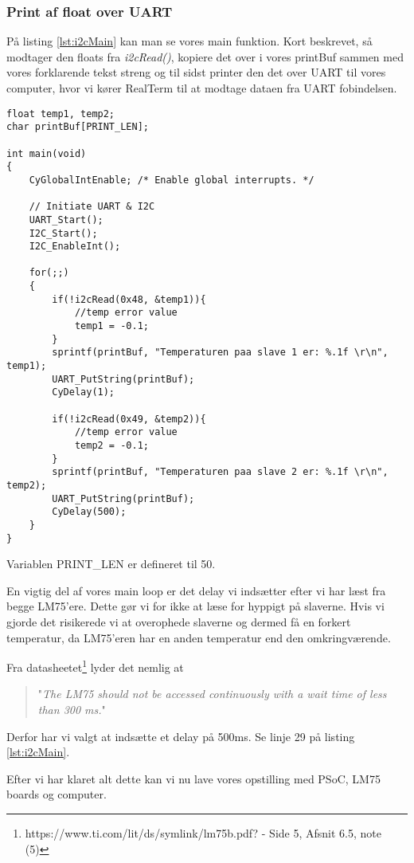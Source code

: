\documentclass[../main.tex]{subfiles}
\begin{document}
\subsubsection{Print af float over UART}

På listing \ref{lst:i2cMain} kan man se vores main funktion. Kort beskrevet, så modtager den floats fra \textit{i2cRead()}, kopiere det over i vores printBuf sammen med vores forklarende tekst streng
 og til sidst printer den det over UART til vores computer, hvor vi kører RealTerm til at modtage dataen fra UART fobindelsen.

\begin{lstlisting}[caption={main()}, label=lst:i2cMain]
float temp1, temp2;
char printBuf[PRINT_LEN];

int main(void)
{
    CyGlobalIntEnable; /* Enable global interrupts. */
    
    // Initiate UART & I2C
    UART_Start();
    I2C_Start();
    I2C_EnableInt();
    
    for(;;)
    {
        if(!i2cRead(0x48, &temp1)){
            //temp error value
            temp1 = -0.1;
        }
        sprintf(printBuf, "Temperaturen paa slave 1 er: %.1f \r\n", temp1);
        UART_PutString(printBuf);
        CyDelay(1);
        
        if(!i2cRead(0x49, &temp2)){
            //temp error value
            temp2 = -0.1;
        }
        sprintf(printBuf, "Temperaturen paa slave 2 er: %.1f \r\n", temp2);
        UART_PutString(printBuf);
        CyDelay(500);
    }
}
\end{lstlisting}
Variablen PRINT\_LEN er defineret til 50.

En vigtig del af vores main loop er det delay vi indsætter efter vi har læst fra begge LM75'ere. Dette gør vi for ikke at læse for hyppigt på slaverne. 
Hvis vi gjorde det risikerede vi at overophede slaverne og dermed få en forkert temperatur, da LM75'eren har en anden temperatur end den omkringværende.

Fra datasheetet\footnote{https://www.ti.com/lit/ds/symlink/lm75b.pdf? - Side 5, Afsnit 6.5, note (5)} lyder det nemlig at
\begin{quote}
    "\textit{The LM75 should not be accessed continuously with a
wait time of less than 300 ms.}"
\end{quote}

Derfor har vi valgt at indsætte et delay på 500ms. Se linje 29 på listing \ref{lst:i2cMain}.

Efter vi har klaret alt dette kan vi nu lave vores opstilling med PSoC, LM75 boards og computer.
\end{document}

